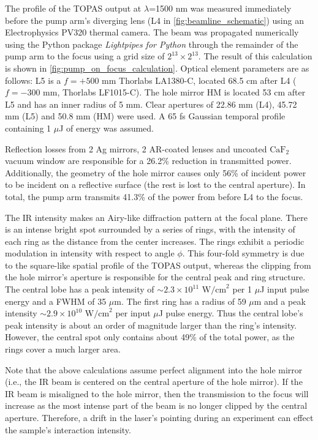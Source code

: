 The profile of the TOPAS output at $\lambda$=1500 nm was measured immediately before the pump arm's diverging lens (L4 in \cref{fig:beamline_schematic}) using an Electrophysics PV320 thermal camera. The beam was propagated numerically using the Python package \textit{Lightpipes for Python} \cite{vdovinLightPipesPython} through the remainder of the pump arm to the focus using a grid size of $2^{13}\times2^{13}$. The result of this calculation is shown in \cref{fig:pump_on_focus_calculation}. Optical element parameters are as follows: L5 is a $f = +500 \text{ mm}$ Thorlabs LA1380-C, located 68.5 cm after L4 ($f = -300 \text{ mm}$, Thorlabs LF1015-C). The hole mirror HM is located 53 cm after L5 and has an inner radius of 5 mm. Clear apertures of 22.86 mm (L4), 45.72 mm (L5) and 50.8 mm (HM) were used. A 65 fs Gaussian temporal profile containing 1 $\mu$J of energy was assumed.

Reflection losses from 2 Ag mirrors, 2 AR-coated lenses and uncoated $\text{CaF}_2$ vacuum window are responsible for a 26.2\% reduction in transmitted power. Additionally, the geometry of the hole mirror causes only 56\% of incident power to be incident on a reflective surface (the rest is lost to the central aperture). In total, the pump arm transmits 41.3\% of the power from before L4 to the focus.

The IR intensity makes an Airy-like diffraction pattern at the focal plane. There is an intense bright spot surrounded by a series of rings, with the intensity of each ring as the distance from the center increases. The rings exhibit a periodic modulation in intensity with respect to angle $\phi$. This four-fold symmetry is due to the square-like spatial profile of the TOPAS output, whereas the clipping from the hole mirror's aperture is responsible for the central peak and ring structure. The central lobe has a peak intensity of $\sim 2.3 \times 10^{11} \text{ W/cm}^2$ per 1 $\mu$J input pulse energy and a FWHM of 35 $\mu$m. The first ring has a radius of 59 $\mu$m and a peak intensity $\sim 2.9 \times 10^{10} \text{ W/cm}^2$ per input $\mu$J pulse energy. Thus the central lobe's peak intensity is about an order of magnitude larger than the ring's intensity. However, the central spot only contains about 49\% of the total power, as the rings cover a much larger area.

Note that the above calculations assume perfect alignment into the hole mirror (i.e., the IR beam is centered on the central aperture of the hole mirror). If the IR beam is misaligned to the hole mirror, then the transmission to the focus will increase as the most intense part of the beam is no longer clipped by the central aperture. Therefore, a drift in the laser's pointing during an experiment can effect the sample's interaction intensity.


